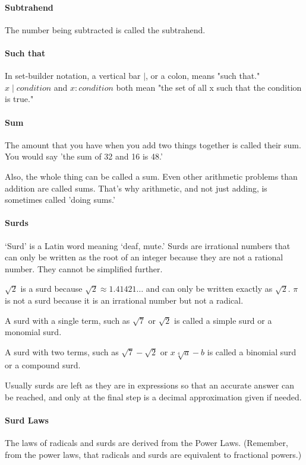 \documentclass[12pt]{article}
\begin{document}
\paragraph{Subtrahend}
The number being subtracted is called the subtrahend.

\paragraph{Such that}
In set-builder notation, a vertical bar $\mid$, or a colon, means "such that." ${x \mid condition}$ and ${x : condition}$ both mean "the set of all x such that the condition is true."

\paragraph{Sum} The amount that you have when you add two things together is called their sum. You would say 'the sum of 32 and 16 is 48.'

Also, the whole thing can be called a sum. Even other arithmetic problems than addition are called sums. That's why arithmetic, and not just adding, is sometimes called 'doing sums.'

\paragraph{Surds}
‘Surd’ is a Latin word meaning ‘deaf, mute.’ Surds are irrational numbers that can only be written as the root of an integer because they are not a rational number. They cannot be simplified further.

$\sqrt{2}$ is a surd because $\sqrt{2}\approx 1.41421\ldots$ and can only be written exactly as $\sqrt{2}$. $\pi$ is not a surd because it is an irrational number but not a radical.

A surd with a single term, such as $\sqrt{7}$ or $\sqrt{2}$ is called a simple surd or a monomial surd.

A surd with two terms, such as $\sqrt{7}-\sqrt{2}$ or $x\sqrt[4]{a}-b$ is called a binomial surd or a compound surd.

Usually surds are left as they are in expressions so that an accurate answer can be reached, and only at the final step is a decimal approximation given if needed.

\paragraph{Surd Laws}
The laws of radicals and surds are derived from the Power Laws. (Remember, from the power laws, that radicals and surds are equivalent to fractional powers.)
\end{document}
